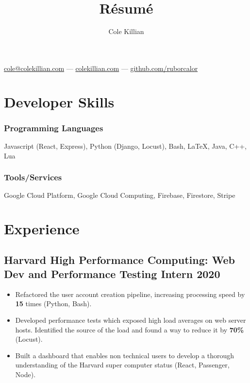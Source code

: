 \documentclass{article}
\makeatletter
\renewcommand{\maketitle}{
\begin{center}
{\color{black}\huge\bfseries
\theauthor}

\vspace{.25em}
\href{mailto:cole@colekillian.com}{cole@colekillian.com} --- \href{https://colekillian.com}{colekillian.com} --- \href{https://github.com/ruborcalor}{github.com/ruborcalor} 
\end{center}
}
\makeatother
\begin{document}
\title{R\'esum\'e}
\author{Cole Killian}

\maketitle
\thispagestyle{empty} 

\section{Developer Skills\hfill\normalsize}

\subsubsection{Programming Languages} 
\hfill Javascript (React, Express), Python (Django, Locust), Bash, \LaTeX, Java, C++, Lua
\subsubsection{Tools/Services}
\hfill Google Cloud Platform, Google Cloud Computing, Firebase, Firestore, Stripe

\section{Experience}

\subsection{Harvard High Performance Computing: Web Dev and Performance Testing Intern \hfill 2020}
\begin{itemize}[leftmargin=0.5in]
  \setlength\itemsep{0.00em}
  \item Refactored the user account creation pipeline, increasing processing speed by \textbf{15} times (Python, Bash).
  \item Developed performance tests which exposed high load averages on web server hosts. Identified the source of the load and found a way to reduce it by \textbf{70\%} (Locust).
  \item Built a dashboard that enables non technical users to develop a thorough understanding of the Harvard super computer status (React, Passenger, Node).
    
\end{itemize}
\end{document}
